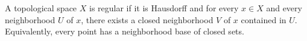 A topological space $X$ is regular if it is Hausdorff and for every $x \in X$ and every neighborhood $U$ of $x$, there exists a closed neighborhood $V$ of $x$ contained in $U$. Equivalently, every point has a neighborhood base of closed sets.
